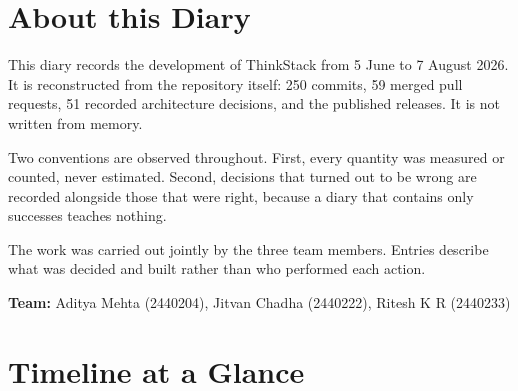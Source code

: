 \documentclass[11pt,a4paper]{article}
\begin{document}

\newpage
\section*{About this Diary}

This diary records the development of ThinkStack from 5 June to 7 August 2026.
It is reconstructed from the repository itself: 250 commits, 59 merged pull
requests, 51 recorded architecture decisions, and the published releases. It is
not written from memory.

Two conventions are observed throughout. First, every quantity was measured or
counted, never estimated. Second, decisions that turned out to be wrong are
recorded alongside those that were right, because a diary that contains only
successes teaches nothing.

The work was carried out jointly by the three team members. Entries describe
what was decided and built rather than who performed each action.

\vspace{0.6cm}
\noindent\textbf{Team:} Aditya Mehta (2440204), Jitvan Chadha (2440222), Ritesh K R (2440233)

\newpage
\tableofcontents
\newpage

\section{Timeline at a Glance}
\end{document}
